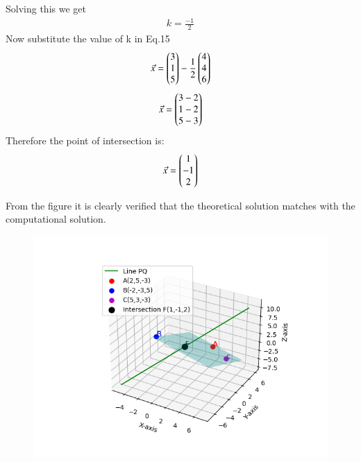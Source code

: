 \documentclass[journal]{IEEEtran}
\theoremstyle{remark}
\begin{document}
Solving this we get
\begin{align}
k=\frac{-1}{2}
\end{align}
Now substitute the value of k in Eq.15
\begin{align}
    \Vec{x}=\begin{pmatrix}3\\1\\5\end{pmatrix}-\frac{1}{2}\begin{pmatrix}4\\4\\6\end{pmatrix}
\end{align}
\begin{align}
    \Vec{x}=\begin{pmatrix}3-2\\1-2\\5-3\end{pmatrix}
\end{align}
Therefore the point of intersection is:
\begin{align}
    \Vec{x}=\begin{pmatrix}1\\-1\\2\end{pmatrix}
\end{align}



From the figure it is clearly verified that the theoretical solution matches with the computational solution.\\
\begin{figure}[h]
    \centering
    \includegraphics[height=0.5\textheight, keepaspectratio]{figs/figure1.png}
    \label{figure_1}
\end{figure}
\end{document}
